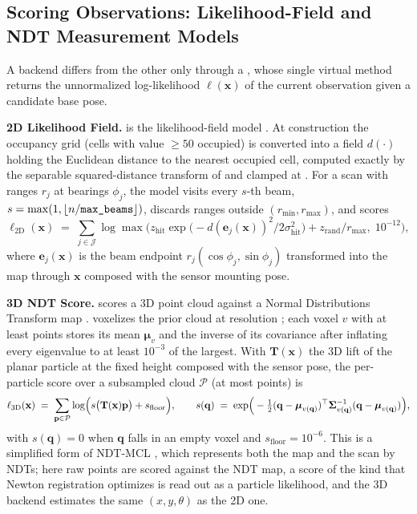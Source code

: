 \subsection{Scoring Observations: Likelihood-Field and NDT Measurement Models}\label{sec:meas}

A backend differs from the other only through a , whose single virtual method returns the unnormalized log-likelihood $\ell(\mathbf{x})$ of the current observation given a candidate base pose.

\noindent\textbf{2D Likelihood Field.}  is the likelihood-field model \citep{thrun2005probabilistic}. At construction the occupancy grid (cells with value $\ge50$ occupied) is converted into a field $d(\cdot)$ holding the Euclidean distance to the nearest occupied cell, computed exactly by the separable squared-distance transform of \citet{felzenszwalb2012distance} and clamped at . For a scan with ranges $r_j$ at bearings $\phi_j$, the model visits every $s$-th beam, $s=\max(1,\lfloor n/\texttt{max\_beams}\rfloor)$, discards ranges outside $(r_{\min},r_{\max})$, and scores
\begin{equation}\label{eq:laser}
  \ell_{\mathrm{2D}}(\mathbf{x}) \;=\; \sum_{j\in\mathcal{J}} \log\max\!\Big(z_{\mathrm{hit}}\exp\!\big(-d(\mathbf{e}_j(\mathbf{x}))^2/2\sigma_{\mathrm{hit}}^2\big) + z_{\mathrm{rand}}/r_{\max},\; 10^{-12}\Big),
\end{equation}
where $\mathbf{e}_j(\mathbf{x})$ is the beam endpoint $r_j(\cos\phi_j,\sin\phi_j)$ transformed into the map through $\mathbf{x}$ composed with the sensor mounting pose.

\noindent\textbf{3D NDT Score.}  scores a 3D point cloud against a Normal Distributions Transform map \citep{biber2003ndt,magnusson2007scan}.  voxelizes the prior cloud at resolution ; each voxel $v$ with at least  points stores its mean $\boldsymbol{\mu}_v$ and the inverse of its covariance after inflating every eigenvalue to at least $10^{-3}$ of the largest. With $\mathbf{T}(\mathbf{x})$ the 3D lift of the planar particle at the fixed height  composed with the sensor pose, the per-particle score over a subsampled cloud $\mathcal{P}$ (at most  points) is
\begin{equation}\label{eq:ndt}
  \ell_{\mathrm{3D}}(\mathbf{x}) \;=\; \sum_{\mathbf{p}\in\mathcal{P}} \log\!\Big(s\big(\mathbf{T}(\mathbf{x})\mathbf{p}\big) + s_{\mathrm{floor}}\Big),\qquad
  s(\mathbf{q}) \;=\; \exp\!\Big(-\tfrac{1}{2}(\mathbf{q}-\boldsymbol{\mu}_{v(\mathbf{q})})^{\top}\boldsymbol{\Sigma}_{v(\mathbf{q})}^{-1}(\mathbf{q}-\boldsymbol{\mu}_{v(\mathbf{q})})\Big),
\end{equation}
with $s(\mathbf{q})=0$ when $\mathbf{q}$ falls in an empty voxel and $s_{\mathrm{floor}}=10^{-6}$. This is a simplified form of NDT-MCL \citep{saarinen2013ndtmcl}, which represents both the map and the scan by NDTs; here raw points are scored against the NDT map, a score of the kind that Newton registration optimizes is read out as a particle likelihood, and the 3D backend estimates the same $(x,y,\theta)$ as the 2D one.

